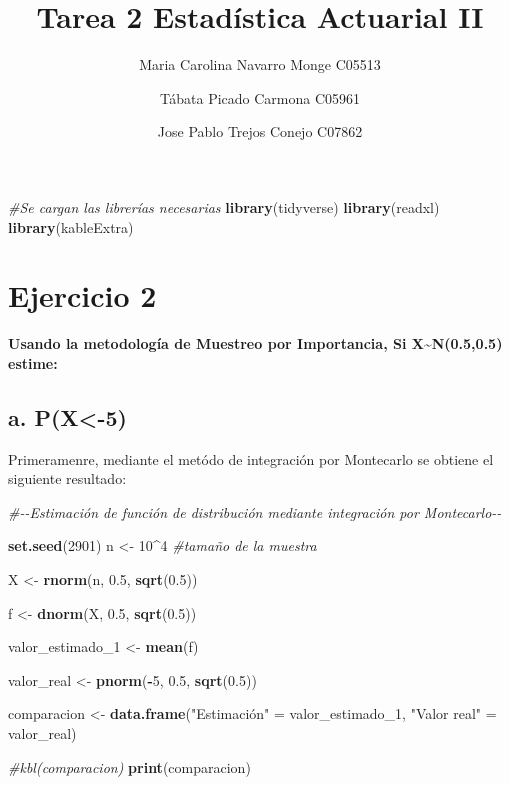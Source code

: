 \documentclass[
]{article}
\title{Tarea 2 Estadística Actuarial II}
\author{Maria Carolina Navarro Monge C05513 \and Tábata Picado Carmona
C05961 \and Jose Pablo Trejos Conejo C07862}
\date{}
\newenvironment{Shaded}{\begin{snugshade}}{\end{snugshade}}
\newcommand{\CommentTok}[1]{\textcolor[rgb]{0.56,0.35,0.01}{\textit{#1}}}
\newcommand{\DecValTok}[1]{\textcolor[rgb]{0.00,0.00,0.81}{#1}}
\newcommand{\FloatTok}[1]{\textcolor[rgb]{0.00,0.00,0.81}{#1}}
\newcommand{\FunctionTok}[1]{\textcolor[rgb]{0.13,0.29,0.53}{\textbf{#1}}}
\newcommand{\NormalTok}[1]{#1}
\newcommand{\OtherTok}[1]{\textcolor[rgb]{0.56,0.35,0.01}{#1}}
\newcommand{\SpecialCharTok}[1]{\textcolor[rgb]{0.81,0.36,0.00}{\textbf{#1}}}
\newcommand{\StringTok}[1]{\textcolor[rgb]{0.31,0.60,0.02}{#1}}
\begin{document}
\maketitle

\begin{Shaded}
\begin{Highlighting}[]
\CommentTok{\#Se cargan las librerías necesarias}
\FunctionTok{library}\NormalTok{(tidyverse)}
\FunctionTok{library}\NormalTok{(readxl)}
\FunctionTok{library}\NormalTok{(kableExtra)}
\end{Highlighting}
\end{Shaded}

\hypertarget{ejercicio-2}{%
\section{Ejercicio 2}\label{ejercicio-2}}

\textbf{Usando la metodología de Muestreo por Importancia, Si
X\textasciitilde N(0.5,0.5) estime:}

\hypertarget{a.-px-5}{%
\subsection{a. P(X\textless-5)}\label{a.-px-5}}

Primeramenre, mediante el metódo de integración por Montecarlo se
obtiene el siguiente resultado:

\begin{Shaded}
\begin{Highlighting}[]
\CommentTok{\#{-}{-}Estimación de función de distribución mediante integración por Montecarlo{-}{-}}

\FunctionTok{set.seed}\NormalTok{(}\DecValTok{2901}\NormalTok{)}
\NormalTok{n }\OtherTok{\textless{}{-}} \DecValTok{10}\SpecialCharTok{\^{}}\DecValTok{4} \CommentTok{\#tamaño de la muestra}

\NormalTok{X }\OtherTok{\textless{}{-}} \FunctionTok{rnorm}\NormalTok{(n, }\FloatTok{0.5}\NormalTok{, }\FunctionTok{sqrt}\NormalTok{(}\FloatTok{0.5}\NormalTok{))}

\NormalTok{f }\OtherTok{\textless{}{-}} \FunctionTok{dnorm}\NormalTok{(X, }\FloatTok{0.5}\NormalTok{, }\FunctionTok{sqrt}\NormalTok{(}\FloatTok{0.5}\NormalTok{))}

\NormalTok{valor\_estimado\_1 }\OtherTok{\textless{}{-}} \FunctionTok{mean}\NormalTok{(f)}

\NormalTok{valor\_real }\OtherTok{\textless{}{-}} \FunctionTok{pnorm}\NormalTok{(}\SpecialCharTok{{-}}\DecValTok{5}\NormalTok{, }\FloatTok{0.5}\NormalTok{, }\FunctionTok{sqrt}\NormalTok{(}\FloatTok{0.5}\NormalTok{))}

\NormalTok{comparacion }\OtherTok{\textless{}{-}} \FunctionTok{data.frame}\NormalTok{(}\StringTok{"Estimación"} \OtherTok{=}\NormalTok{ valor\_estimado\_1, }\StringTok{"Valor real"} \OtherTok{=}\NormalTok{ valor\_real)}

\CommentTok{\#kbl(comparacion)}
\FunctionTok{print}\NormalTok{(comparacion)}
\end{Highlighting}
\end{Shaded}
\end{document}
